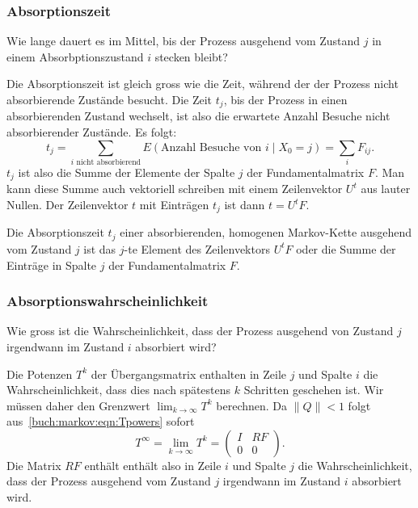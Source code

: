 \subsubsection{Absorptionszeit}
%
\begin{frage}
Wie lange dauert es im Mittel, bis der Prozess ausgehend vom Zustand $j$
in einem Absorbptionszustand $i$ stecken bleibt?
\end{frage}
Die Absorptionszeit ist gleich gross wie die Zeit,
während der der Prozess nicht absorbierende
Zustände besucht.
Die Zeit $t_j$, bis der Prozess in einen absorbierenden Zustand wechselt, ist also
die erwartete Anzahl Besuche nicht absorbierender Zustände.
Es folgt:
\[
t_j
=
\sum_{\text{$i$ nicht absorbierend}} E(\text{Anzahl Besuche von $i$}\mid X_0=j)
=
\sum_{i} F_{i\!j}.
\]
$t_j$ ist also die Summe der Elemente der Spalte $j$ der Fundamentalmatrix $F$.
Man kann diese Summe auch vektoriell schreiben mit einem Zeilenvektor $U^t$
aus lauter Nullen.
Der Zeilenvektor $t$ mit Einträgen $t_j$ ist dann
\(
t = U^tF.
\)
\begin{satz}
\label{buch:markov:satz:absorptionszeit}
Die Absorptionszeit $t_j$ einer absorbierenden, homogenen Markov-Kette
ausgehend vom Zustand $j$ ist
das $j$-te Element des Zeilenvektors $U^tF$ oder die Summe der
Einträge in Spalte $j$ der Fundamentalmatrix $F$.
\end{satz}

\subsubsection{Absorptionswahrscheinlichkeit}
%
\begin{frage}
Wie gross ist die Wahrscheinlichkeit, dass der Prozess ausgehend von
Zustand $j$ irgendwann im Zustand $i$ absorbiert wird?
\end{frage}
Die Potenzen $T^k$ der Übergangsmatrix enthalten in Zeile $j$
und Spalte $i$ die Wahrscheinlichkeit, dass dies nach spätestens $k$ Schritten
geschehen ist.
Wir müssen daher den Grenzwert
\(
\lim_{k\to\infty}T^k
\)
berechnen.
Da $\|Q\|<1$ folgt aus~\eqref{buch:markov:eqn:Tpowers} sofort
\[
T^\infty
=
\lim_{k\to\infty}T^k
=
\left(
\begin{array}{cc}
I&RF\\
0&0
\end{array}
\right).
\]
Die Matrix $RF$ enthält enthält also in Zeile $i$ und Spalte $j$
die Wahrscheinlichkeit, dass der Prozess ausgehend vom Zustand $j$
irgendwann im Zustand $i$ absorbiert wird.

